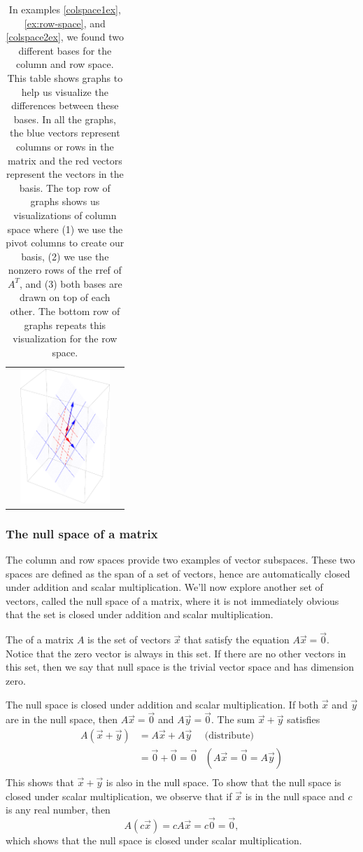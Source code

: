 \begin{table}
\begin{tabular}{ccc}
&\includegraphics[height=2in]{02-Applications/support/rowspace3}
\end{tabular}

\caption{\label{column and row space table} In examples \ref{colspace1ex}, \ref{ex:row-space}, and \ref{colspace2ex}, we found two different bases for the column and row space. This table shows graphs to help us visualize the differences between these bases.  In all the graphs, the blue vectors represent columns or rows in the matrix and the red vectors represent the vectors in the basis.  
The top row of graphs shows us visualizations of column space where (1) we use the pivot columns to create our basis, (2) we use the nonzero rows of the rref of $A^T$, and (3) both bases are drawn on top of each other.
The bottom row of graphs repeats this visualization for the row space.}
\end{table}

\subsubsection{The null space of a matrix}
The column and row spaces provide two examples of vector subspaces. These two spaces are defined as the span of a set of vectors, hence are automatically closed under addition and scalar multiplication. We'll now explore another set of vectors, called the null space of a matrix, where it is not immediately obvious that the set is closed under addition and scalar multiplication.

The 
%
of a matrix $A$ is the set of vectors $\vec x$ that satisfy the equation $A\vec x=\vec 0$. Notice that the zero vector is always in this set. If there are no other vectors in this set, then we say that null space is the trivial vector space and has dimension zero.  

The null space is closed under addition and scalar multiplication.  If both $\vec x$ and $\vec y$ are in the null space, then $A\vec x=\vec 0$ and $A\vec y=\vec 0$. The sum $\vec x+\vec y$ satisfies 
\begin{align*}
A(\vec x+\vec y)
&= A\vec x+A\vec y &\text{(distribute)}\\
&= \vec 0 +\vec 0 = \vec 0 &(A\vec x = \vec 0 =A\vec y)\\
\end{align*}
This shows that $\vec x+\vec y$ is also in the null space.  
To show that the null space is closed under scalar multiplication, we observe that if $\vec x$ is in the null space and $c$ is any real number, then $$A(c\vec x) = cA\vec x = c\vec 0 = \vec 0,$$
which shows that the null space is closed under scalar multiplication.

